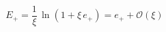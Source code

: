\begin{equation}\label{boro1.5}
E_{+}^{}=\frac{1}{\xi}\,\ln(1+\xi\,e_{+}^{})=e_{+}^{}+{\mathcal O}(\xi)
\end{equation} 
